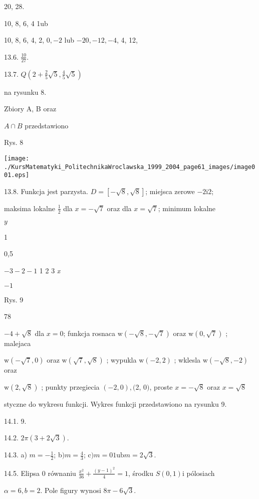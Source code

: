 \documentclass[a4paper,12pt]{article}
\begin{document}
20, 28.

10, 8, 6, 4 1ub

10, 8, 6, 4, 2, $0, -2$ lub $-20, -12, -4$, 4, 12,

13.6. $\displaystyle \frac{10}{27}.$

13.7. $Q(2+\displaystyle \frac{2}{5}\sqrt{5},\frac{4}{5}\sqrt{5})$

na rysunku 8.

Zbiory A, B oraz

$A\cap B$ przedstawiono

Rys. 8
\begin{center}
\texttt{[image: ./KursMatematyki\_PolitechnikaWroclawska\_1999\_2004\_page61\_images/image001.eps]}
\end{center}
13.8. Funkcja jest parzysta. $D = [-\sqrt{8},\sqrt{8}]$; miejsca zerowe $-2\mathrm{i}2$;

maksima lokalne $\displaystyle \frac{1}{2}$ dla $x = -\sqrt{7}$ oraz dla $x = \sqrt{7}$; minimum lokalne

$y$

1

0,5

$-3  -2  -1$  1 2  3  {\it x}

$-1$

Rys. 9





78

$-4+\sqrt{8}$ dla $x=0$; funkcja rosnaca $\mathrm{w}(-\sqrt{8},-\sqrt{7})$ oraz $\mathrm{w}(0,\sqrt{7})$ ; malejaca

$\mathrm{w}(-\sqrt{7},0)$ oraz $\mathrm{w}(\sqrt{7},\sqrt{8})$ ; wypukla $\mathrm{w}(-2,2)$ ; wklesla $\mathrm{w}(-\sqrt{8},-2)$ oraz

$\mathrm{w}(2,\sqrt{8})$ ; punkty przegiecia $(-2,0), ($2, $0)$, proste $x=-\sqrt{8}$ oraz $x=\sqrt{8}$

styczne do wykresu funkcji. Wykres funkcji przedstawiono na rysunku 9.

14.1. 9.

14.2. $2\pi(3+2\sqrt{3}).$

14.3. a) $m=-\displaystyle \frac{1}{2}$; b$)m=\displaystyle \frac{4}{3}$; c$)m=01\mathrm{u}\mathrm{b}m=2\sqrt{3}.$

14.5. Elipsa $0$ równaniu $\displaystyle \frac{x^{2}}{36}+\frac{(y-1)^{2}}{4}=1$, środku $S(0,1)\mathrm{i}$ pólosiach

$\alpha=6, b=2$. Pole figury wynosi $8\pi-6\sqrt{3}.$
\end{document}
